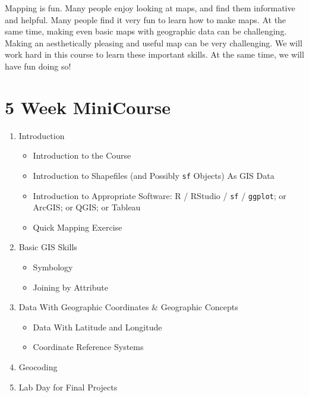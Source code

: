 \documentclass[
  letterpaper,
  DIV=11,
  numbers=noendperiod,
  oneside]{scrreprt}
\providecommand{\tightlist}{%
  \setlength{\itemsep}{0pt}\setlength{\parskip}{0pt}}\usepackage{longtable,booktabs,array}
\begin{document}
\begin{tcolorbox}[enhanced jigsaw, opacityback=0, colback=white, toprule=.15mm, colframe=quarto-callout-important-color-frame, bottomrule=.15mm, title=\textcolor{quarto-callout-important-color}{\faExclamation}\hspace{0.5em}{Mapping is FUN \textbf{and} CHALLENGING}, coltitle=black, toptitle=1mm, bottomtitle=1mm, arc=.35mm, breakable, colbacktitle=quarto-callout-important-color!10!white, left=2mm, rightrule=.15mm, titlerule=0mm, leftrule=.75mm, opacitybacktitle=0.6]

Mapping is fun. Many people enjoy looking at maps, and find them
informative and helpful. Many people find it very fun to learn how to
make maps. At the same time, making even basic maps with geographic data
can be challenging. Making an aesthetically pleasing and useful map can
be very challenging. We will work hard in this course to learn these
important skills. At the same time, we will have fun doing so!

\end{tcolorbox}

\section{5 Week MiniCourse}\label{sec-fiveweek}

\begin{enumerate}
\def\labelenumi{\arabic{enumi}.}
\tightlist
\item
  Introduction

  \begin{itemize}
  \tightlist
  \item
    Introduction to the Course
  \item
    Introduction to Shapefiles (and Possibly \texttt{sf} Objects) As GIS
    Data
  \item
    Introduction to Appropriate Software: R / RStudio / \texttt{sf} /
    \texttt{ggplot}; or ArcGIS; or QGIS; or Tableau
  \item
    Quick Mapping Exercise
  \end{itemize}
\item
  Basic GIS Skills

  \begin{itemize}
  \tightlist
  \item
    Symbology
  \item
    Joining by Attribute
  \end{itemize}
\item
  Data With Geographic Coordinates \& Geographic Concepts

  \begin{itemize}
  \tightlist
  \item
    Data With Latitude and Longitude
  \item
    Coordinate Reference Systems
  \end{itemize}
\item
  Geocoding
\item
  Lab Day for Final Projects
\end{enumerate}
\end{document}

